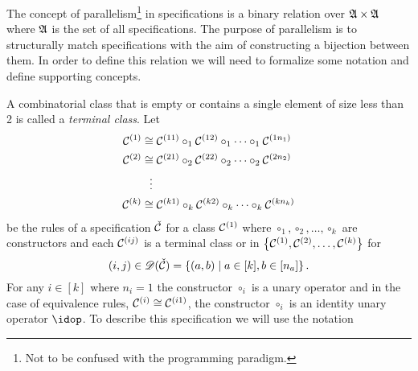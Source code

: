 \label{ch:parallel}
The concept of parallelism\footnote{Not to be confused with the programming paradigm.} in specifications is a binary relation over $\mathfrak{A} \times \mathfrak{A}$ where $\mathfrak{A}$ is the set of all specifications. The purpose of parallelism is to structurally match specifications with the aim of constructing a bijection between them. In order to define this relation  we will need to formalize some notation and define supporting concepts.

A combinatorial class that is empty or contains a single element of size less than 2 is called a \emph{terminal class}. Let
\begin{align*}
    \mathcal{C}^{\left(1\right)} &\cong \mathcal{C}^{\left(11\right)} \circ_1 \mathcal{C}^{\left(12\right)} \circ_1 \dotsm \circ_1 \mathcal{C}^{\left(1n_1\right)}\\
    \mathcal{C}^{\left(2\right)} &\cong \mathcal{C}^{\left(21\right)} \circ_2 \mathcal{C}^{\left(22\right)} \circ_2 \dotsm \circ_2 \mathcal{C}^{\left(2n_2\right)}\\
    &\hspace{0.25cm}\vdots\\
    \mathcal{C}^{\left(k\right)} &\cong \mathcal{C}^{\left(k1\right)} \circ_k \mathcal{C}^{\left(k2\right)} \circ_k \dotsm \circ_k \mathcal{C}^{\left(kn_k\right)}\\
\end{align*}
be the rules of a specification $\check{\mathcal{C}}$ for a class $\mathcal{C}^{\left(1\right)}$ where $\circ_1,\circ_2,\dotsc,\circ_k$ are constructors and each $\mathcal{C}^{\left(ij\right)}$ is a terminal class or in $\left\{\mathcal{C}^{\left(1\right)}, \mathcal{C}^{\left(2\right)}, \dotsc, \mathcal{C}^{\left(k\right)}\right\}$ for
\[
    (i,j) \in \mathscr{D}(\check{\mathcal{C}}) = \left\{(a,b) \mid a \in [k], b \in [n_a]\right\}.
\]
For any $i\in[k]$ where $n_i=1$ the constructor $\circ_i$ is a unary operator and in the case of equivalence rules, $\mathcal{C}^{\left(i\right)} \cong \mathcal{C}^{\left(i1\right)}$, the constructor $\circ_i$ is an identity unary operator $\idop$. To describe this specification we will use the notation 
